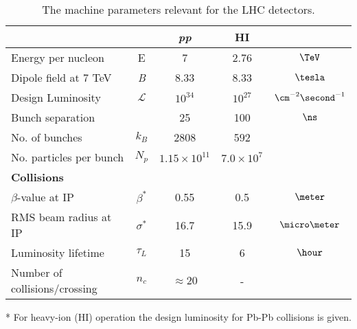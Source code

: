 \begin{table}[!htb]
  \centering
  \begin{threeparttable}
    \begin{tabular}{|lcccc|}
    \hline 
                                  &              &           \textit{pp} &         \textbf{HI} &  \\
    \hline\hline
    Energy per nucleon            & E            &                     7 &                2.76 &                 $\TeV$ \\
    Dipole field at 7 TeV         & \textit{B}   &                  8.33 &                8.33 &               $\tesla$ \\
    Design Luminosity\tnote{*}    & $\mathcal{L}$ &            $10^{34}$ &           $10^{27}$ & $\cm^{-2}\second^{-1}$ \\
    Bunch separation              &              &                    25 &                 100 &                  $\ns$ \\
    No. of bunches                & $k_B$        &                  2808 &                 592 &                        \\
    No. particles per bunch       & $N_p$        & $1.15 \times 10^{11}$ & $7.0 \times 10^{7}$ &                        \\
    \hline
    \hline
    \textbf{Collisions}           &              &  &  &  \\
    \hline
    $\beta$-value at IP           & $\beta^{*}$  &                  0.55 &                 0.5 &        $\meter$ \\
    RMS beam radius at IP         & $\sigma^{*}$ &                  16.7 &                15.9 &  $\micro\meter$ \\
    Luminosity lifetime           & $\tau_L$     &                    15 &                   6 &         $\hour$ \\
    Number of collisions/crossing & $n_c$        &          $\approx 20$ &                   - &                 \\
    \hline
    \end{tabular}
    \begin{tablenotes}
      \item[*] For heavy-ion (HI) operation the design luminosity for Pb-Pb collisions is given.
    \end{tablenotes}
  \end{threeparttable}
  \caption[LHC parameters relevant for detectors]{The machine parameters relevant for the 
                                                  LHC detectors.\cite{CMSTDR:CMSPhysicsVol1}}
  \label{TABLE:ExperimentalApparatus_LHCMachineParameters}
\end{table}
